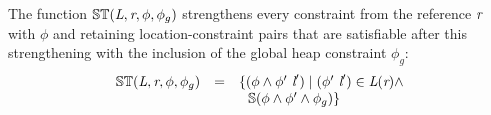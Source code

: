 \begin{definition}
\label{def:ST}
The function $\mathbb{ST}(\emph{L},\emph{r},\phi,\phi_g)$
strengthens every constraint from the reference $\emph{r}$ with
$\phi$ and retaining location-constraint pairs that are satisfiable
after this strengthening with the inclusion of the global heap
constraint $\phi_g$:
\[
\begin{array}{rcl} 
\mathbb{ST}(\cfgnt{L},\cfgnt{r},\phi,\phi_g) & = & \{ (\phi\wedge\phi^\prime\ \cfgnt{l}^\prime) \mid (\phi^\prime\ \cfgnt{l}^\prime)\in \cfgnt{L}(\cfgnt{r})\wedge \\ & & 
\ \ \mathbb{S}(\phi\wedge\phi^\prime\wedge\phi_g) \}
\end{array}
\]
\end{definition}
